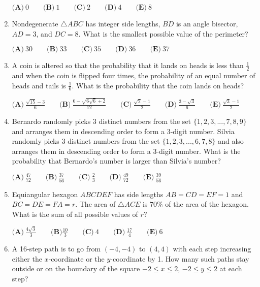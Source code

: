 \documentclass{article}
\begin{document}
\begin{enumerate}[label=\arabic*., itemsep=0.5em]
\(\textbf{(A)}\ 0 \qquad \textbf{(B)}\ 1 \qquad \textbf{(C)}\ 2 \qquad \textbf{(D)}\ 4 \qquad \textbf{(E)}\ 8\)\par \vspace{0.5em}\item Nondegenerate \(\triangle ABC\) has integer side lengths, \(\overline{BD}\) is an angle bisector, \(AD = 3\), and \(DC=8\). What is the smallest possible value of the perimeter?

\(\textbf{(A)}\ 30 \qquad \textbf{(B)}\ 33 \qquad \textbf{(C)}\ 35 \qquad \textbf{(D)}\ 36 \qquad \textbf{(E)}\ 37\)\par \vspace{0.5em}\item A coin is altered so that the probability that it lands on heads is less than \(\frac{1}{2}\) and when the coin is flipped four times, the probability of an equal number of heads and tails is \(\frac{1}{6}\). What is the probability that the coin lands on heads?

\(\textbf{(A)}\ \frac{\sqrt{15}-3}{6} \qquad \textbf{(B)}\ \frac{6-\sqrt{6\sqrt{6}+2}}{12} \qquad \textbf{(C)}\ \frac{\sqrt{2}-1}{2} \qquad \textbf{(D)}\ \frac{3-\sqrt{3}}{6} \qquad \textbf{(E)}\ \frac{\sqrt{3}-1}{2}\)\par \vspace{0.5em}\item Bernardo randomly picks 3 distinct numbers from the set \(\{1,2,3,...,7,8,9\}\) and arranges them in descending order to form a 3-digit number. Silvia randomly picks 3 distinct numbers from the set \(\{1,2,3,...,6,7,8\}\) and also arranges them in descending order to form a 3-digit number. What is the probability that Bernardo's number is larger than Silvia's number?

\(\textbf{(A)}\ \frac{47}{72} \qquad \textbf{(B)}\ \frac{37}{56} \qquad \textbf{(C)}\ \frac{2}{3} \qquad \textbf{(D)}\ \frac{49}{72} \qquad \textbf{(E)}\ \frac{39}{56}\)\par \vspace{0.5em}\item Equiangular hexagon \(ABCDEF\) has side lengths \(AB=CD=EF=1\) and \(BC=DE=FA=r\). The area of \(\triangle ACE\) is \(70\%\) of the area of the hexagon. What is the sum of all possible values of \(r\)?

\(\textbf{(A)}\ \frac{4\sqrt{3}}{3} \qquad \textbf{(B)} \frac{10}{3} \qquad \textbf{(C)}\ 4 \qquad \textbf{(D)}\ \frac{17}{4} \qquad \textbf{(E)}\ 6\)\par \vspace{0.5em}\item A 16-step path is to go from \((-4,-4)\) to \((4,4)\) with each step increasing either the \(x\)-coordinate or the \(y\)-coordinate by 1. How many such paths stay outside or on the boundary of the square \(-2 \le x \le 2\), \(-2 \le y \le 2\) at each step?


\end{enumerate}
\end{document}
